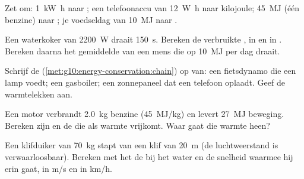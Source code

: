 \begin{exercise}[$\star$]\label{exo:g10:energy-conservation:3}
Zet om: \qty{1}{kW.h} naar ; een telefoonaccu van \qty{12}{W.h}
naar kilojoule; \qty{45}{MJ} (één  benzine) naar ; je
voedseldag van \qty{10}{MJ} naar .
\end{exercise}

\begin{exercise}[$\star$]\label{exo:g10:energy-conservation:4}
Een waterkoker van \qty{2200}{W} draait \qty{150}{s}. Bereken de
verbruikte , in  en in . Bereken daarna het
gemiddelde  van een mens die op \qty{10}{MJ} per dag draait.
\end{exercise}

\begin{exercise}[$\star$]\label{exo:g10:energy-conservation:5}
Schrijf de 
(\cref{met:g10:energy-conservation:chain}) op van: een fietsdynamo die
een lamp voedt; een gasboiler; een zonnepaneel dat een telefoon oplaadt.
Geef de warmtelekken aan.
\end{exercise}

\begin{exercise}[$\star\star$]\label{exo:g10:energy-conservation:6}
Een motor verbrandt \qty{2.0}{kg} benzine (\qty{45}{MJ/kg}) en levert
\qty{27}{MJ} beweging. Bereken zijn  en de  die als
warmte vrijkomt. Waar gaat die warmte heen?
\end{exercise}

\begin{exercise}[$\star\star$]\label{exo:g10:energy-conservation:7}
Een klifduiker van \qty{70}{kg} stapt van een klif van \qty{20}{m} (de
luchtweerstand is verwaarloosbaar). Bereken met het  de
 bij het water en de snelheid waarmee hij erin gaat, in
\unit{m/s} en in \unit{km/h}.
\end{exercise}


